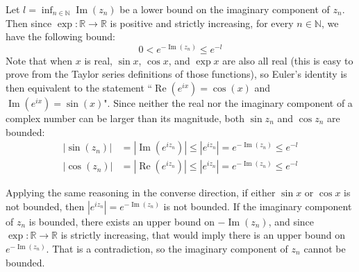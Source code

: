 \documentclass[12pt]{article}
\begin{document}
Let $l = \inf_{n \in \mathbb{N}} \operatorname{Im} (z_n)$ be a lower bound on the imaginary component of $z_n$. Then since $\exp : \mathbb{R} \rightarrow \mathbb{R}$ is positive and strictly increasing, for every $n \in \mathbb{N}$, we have the following bound:
\[ 0 < e^{- \operatorname{Im}(z_n)} \leq e^{-l} \]
Note that when $x$ is real, $\sin x$, $\cos x$, and $\exp x$ are also all real (this is easy to prove from the Taylor series definitions of those functions), so Euler's identity is then equivalent to the statement ``$\operatorname{Re}(e^{ix}) = \cos(x)$ and $\operatorname{Im}(e^{ix}) = \sin(x)$". Since neither the real nor the imaginary component of a complex number can be larger than its magnitude, both $\sin z_n$ and $\cos z_n$ are bounded:
\begin{align*}
    |\sin(z_n)| &= |\operatorname{Im}(e^{i z_n})| \leq |e^{i z_n}| = e^{- \operatorname{Im}(z_n)} \leq e^{-l} \\
    |\cos(z_n)| &= |\operatorname{Re}(e^{i z_n})| \leq |e^{i z_n}| = e^{- \operatorname{Im}(z_n)} \leq e^{-l}
\end{align*}
\par
Applying the same reasoning in the converse direction, if either $\sin x$ or $\cos x$ is not bounded, then $|e^{i z_n}| = e^{- \operatorname{Im}(z_n)}$ is not bounded. If the imaginary component of $z_n$ is bounded, there exists an upper bound on $- \operatorname{Im}(z_n)$, and since $\exp: \mathbb{R} \rightarrow \mathbb{R}$ is strictly increasing, that would imply there is an upper bound on $e^{- \operatorname{Im}(z_n)}$. That is a contradiction, so the imaginary component of $z_n$ cannot be bounded.

\bigskip
\noindent{}\bigskip
\end{document}
